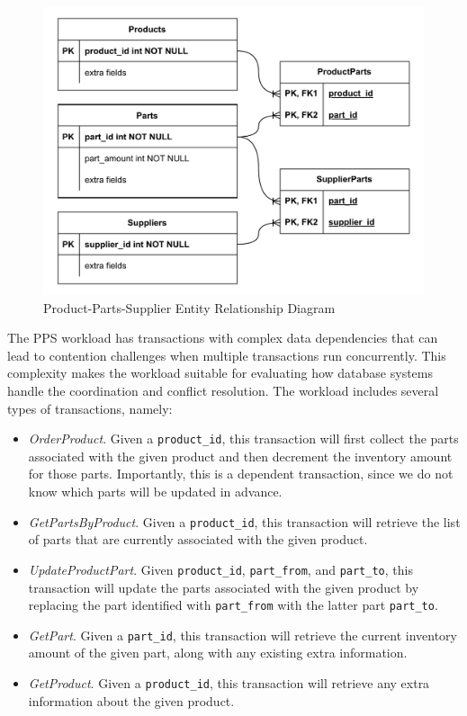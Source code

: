 \begin{figure}[ht]
    \centering
    \includegraphics[width=1\linewidth]{figures/PPS ERD.pdf}
    \caption{Product-Parts-Supplier Entity Relationship Diagram}
    \label{fig: pps-erd}
\end{figure}

The PPS workload has transactions with complex data dependencies that can lead to contention challenges when multiple transactions run concurrently. This complexity makes the workload suitable for evaluating how database systems handle the coordination and conflict resolution. The workload includes several types of transactions, namely:
\begin{itemize}
    \item \textit{OrderProduct}. Given a \texttt{product\_id}, this transaction will first collect the parts associated with the given product and then decrement the inventory amount for those parts. Importantly, this is a dependent transaction, since we do not know which parts will be updated in advance.
    \item \textit{GetPartsByProduct}. Given a \texttt{product\_id}, this transaction will retrieve the list of parts that are currently associated with the given product.
    \item \textit{UpdateProductPart}. Given \texttt{product\_id}, \texttt{part\_from}, and \texttt{part\_to}, this transaction will update the parts associated with the given product by replacing the part identified with \texttt{part\_from} with the latter part \texttt{part\_to}.
    \item \textit{GetPart}. Given a \texttt{part\_id}, this transaction will retrieve the current inventory amount of the given part, along with any existing extra information.
    \item \textit{GetProduct}. Given a \texttt{product\_id}, this transaction will retrieve any extra information about the given product.
\end{itemize}